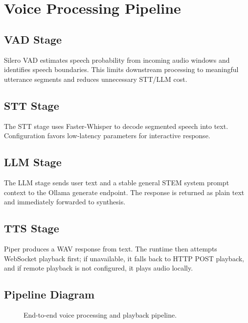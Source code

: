 \documentclass[12pt,a4paper]{article}
\begin{document}
\section{Voice Processing Pipeline}

\subsection{VAD Stage}
Silero VAD estimates speech probability from incoming audio windows and identifies speech boundaries. This limits downstream processing to meaningful utterance segments and reduces unnecessary STT/LLM cost.

\subsection{STT Stage}
The STT stage uses Faster-Whisper to decode segmented speech into text. Configuration favors low-latency parameters for interactive response.

\subsection{LLM Stage}
The LLM stage sends user text and a stable general STEM system prompt context to the Ollama generate endpoint. The response is returned as plain text and immediately forwarded to synthesis.

\subsection{TTS Stage}
Piper produces a WAV response from text. The runtime then attempts WebSocket playback first; if unavailable, it falls back to HTTP POST playback, and if remote playback is not configured, it plays audio locally.

\subsection{Pipeline Diagram}
\begin{figure}[H]
\centering
{}
\caption{End-to-end voice processing and playback pipeline.}
\end{figure}
\end{document}
